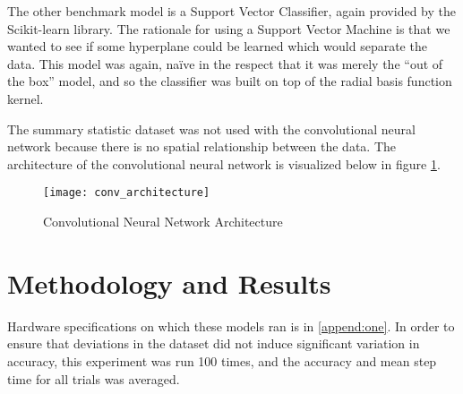 The other benchmark model is a Support Vector Classifier, again provided by the Scikit-learn library.
The rationale for using a Support Vector Machine is that we wanted to see if some hyperplane could be learned which would separate the data.
This model was again, na\"ive in the respect that it was merely the ``out of the box'' model, and so the classifier was built on top of the radial basis function kernel.

The summary statistic dataset was not used with the convolutional neural network because there is no spatial relationship between the data.
The architecture of the convolutional neural network is visualized below in figure \ref{fig:conv net}.

\begin{figure}[ht]
\texttt{[image: conv\_architecture]}
\centering
\caption{Convolutional Neural Network Architecture}
\label{fig:conv net}
\end{figure}


\section{Methodology and Results}
Hardware specifications on which these models ran is in \ref{append:one}.
In order to ensure that deviations in the dataset did not induce significant variation in accuracy, this experiment was run 100 times, and the accuracy and mean step time for all trials was averaged.

